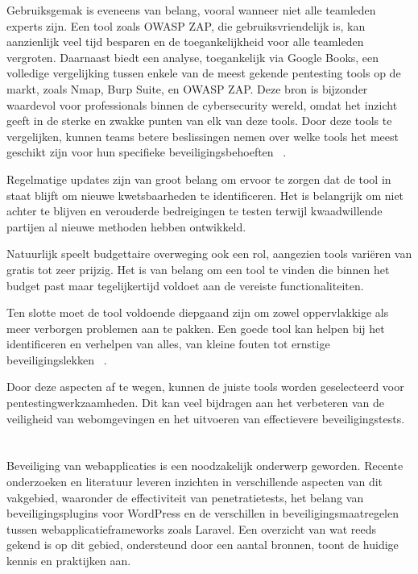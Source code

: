 Gebruiksgemak is eveneens van belang, vooral wanneer niet alle teamleden experts zijn. Een tool zoals OWASP ZAP, 
die gebruiksvriendelijk is, kan aanzienlijk veel tijd besparen en de toegankelijkheid voor alle teamleden vergroten.
Daarnaast biedt een analyse, toegankelijk via Google Books, een volledige vergelijking tussen enkele van de meest gekende pentesting tools op de markt, 
zoals Nmap, Burp Suite, en OWASP ZAP. Deze bron is bijzonder waardevol voor professionals binnen de cybersecurity wereld, omdat het inzicht geeft in de sterke en zwakke 
punten van elk van deze tools. Door deze tools te vergelijken, kunnen teams betere beslissingen nemen over welke tools het meest geschikt zijn 
voor hun specifieke beveiligingsbehoeften ~\autocite{Velu2022}.

Regelmatige updates zijn van groot belang om ervoor te zorgen dat de tool in staat blijft om nieuwe kwetsbaarheden te 
identificeren. Het is belangrijk om niet achter te blijven en verouderde bedreigingen te testen terwijl kwaadwillende 
partijen al nieuwe methoden hebben ontwikkeld.

Natuurlijk speelt budgettaire overweging ook een rol, aangezien tools variëren van gratis tot zeer prijzig. Het 
is van belang om een tool te vinden die binnen het budget past maar tegelijkertijd voldoet aan de vereiste functionaliteiten.

Ten slotte moet de tool voldoende diepgaand zijn om zowel oppervlakkige als meer verborgen problemen aan te pakken. 
Een goede tool kan helpen bij het identificeren en verhelpen van alles, van kleine fouten tot ernstige beveiligingslekken
~\autocite{Maji2022}.

Door deze aspecten af te wegen, kunnen de juiste tools worden geselecteerd voor pentestingwerkzaamheden. 
Dit kan veel bijdragen aan het verbeteren van de veiligheid van webomgevingen en het uitvoeren van effectievere beveiligingstests.

\section{}
\label{sec:wat-weten-we-uit-de-literatuur}
Beveiliging van webapplicaties is een noodzakelijk onderwerp geworden. Recente onderzoeken en literatuur leveren 
inzichten in verschillende aspecten van dit vakgebied, waaronder de effectiviteit van penetratietests, het belang van beveiligingsplugins voor WordPress en de verschillen 
in beveiligingsmaatregelen tussen webapplicatieframeworks zoals Laravel. Een overzicht van wat reeds gekend is op dit gebied, ondersteund door een aantal 
bronnen, toont de huidige kennis en praktijken aan.


